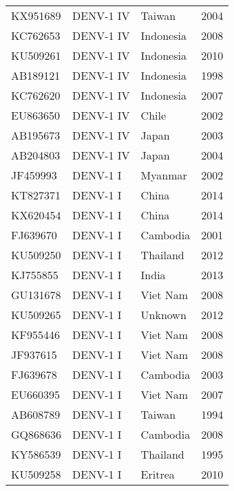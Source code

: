 \begin{longtable}{@{}llll@{}}
KX951689 & DENV-1 IV           & Taiwan      & 2004            \\
KC762653 & DENV-1 IV           & Indonesia   & 2008            \\
KU509261 & DENV-1 IV           & Indonesia   & 2010            \\
AB189121 & DENV-1 IV           & Indonesia   & 1998            \\
KC762620 & DENV-1 IV           & Indonesia   & 2007            \\
EU863650 & DENV-1 IV           & Chile       & 2002            \\
AB195673 & DENV-1 IV           & Japan       & 2003            \\
AB204803 & DENV-1 IV           & Japan       & 2004            \\
JF459993 & DENV-1 I            & Myanmar     & 2002            \\
KT827371 & DENV-1 I            & China       & 2014            \\
KX620454 & DENV-1 I            & China       & 2014            \\
FJ639670 & DENV-1 I            & Cambodia    & 2001            \\
KU509250 & DENV-1 I            & Thailand    & 2012            \\
KJ755855 & DENV-1 I            & India       & 2013            \\
GU131678 & DENV-1 I            & Viet Nam    & 2008            \\
KU509265 & DENV-1 I            & Unknown     & 2012            \\
KF955446 & DENV-1 I            & Viet Nam    & 2008            \\
JF937615 & DENV-1 I            & Viet Nam    & 2008            \\
FJ639678 & DENV-1 I            & Cambodia    & 2003            \\
EU660395 & DENV-1 I            & Viet Nam    & 2007            \\
AB608789 & DENV-1 I            & Taiwan      & 1994            \\
GQ868636 & DENV-1 I            & Cambodia    & 2008            \\
KY586539 & DENV-1 I            & Thailand    & 1995            \\
KU509258 & DENV-1 I            & Eritrea     & 2010           
\end{longtable}